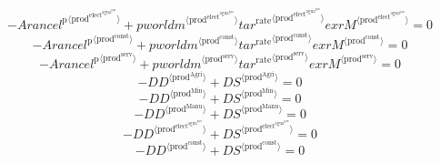 \begin{equation}
-{{A\!r\!a\!n\!c\!e\!l}^{\mathrm{p}}}^{\langle \mathrm{prod}^{\mathrm{elect}^{\mathrm{agua}^{\mathrm{gas}}}}\rangle} + {{{p\!w\!o\!r\!l\!d\!m}}^{\langle \mathrm{\mathrm{prod}^{\mathrm{elect}^{\mathrm{agua}^{\mathrm{gas}}}}}\rangle}} {{{t\!a\!r}^{\mathrm{rate}}}^{\langle \mathrm{\mathrm{prod}^{\mathrm{elect}^{\mathrm{agua}^{\mathrm{gas}}}}}\rangle}} {{e\!x\!r}} {{M}^{\langle \mathrm{prod}^{\mathrm{elect}^{\mathrm{agua}^{\mathrm{gas}}}}\rangle}} = 0
\end{equation}
\begin{equation}
-{{A\!r\!a\!n\!c\!e\!l}^{\mathrm{p}}}^{\langle \mathrm{prod}^{\mathrm{const}}\rangle} + {{{p\!w\!o\!r\!l\!d\!m}}^{\langle \mathrm{\mathrm{prod}^{\mathrm{const}}}\rangle}} {{{t\!a\!r}^{\mathrm{rate}}}^{\langle \mathrm{\mathrm{prod}^{\mathrm{const}}}\rangle}} {{e\!x\!r}} {{M}^{\langle \mathrm{prod}^{\mathrm{const}}\rangle}} = 0
\end{equation}
\begin{equation}
-{{A\!r\!a\!n\!c\!e\!l}^{\mathrm{p}}}^{\langle \mathrm{prod}^{\mathrm{serv}}\rangle} + {{{p\!w\!o\!r\!l\!d\!m}}^{\langle \mathrm{\mathrm{prod}^{\mathrm{serv}}}\rangle}} {{{t\!a\!r}^{\mathrm{rate}}}^{\langle \mathrm{\mathrm{prod}^{\mathrm{serv}}}\rangle}} {{e\!x\!r}} {{M}^{\langle \mathrm{prod}^{\mathrm{serv}}\rangle}} = 0
\end{equation}
\begin{equation}
-{{D\!D}}^{\langle \mathrm{prod}^{\mathrm{Agri}}\rangle} + {{D\!S}}^{\langle \mathrm{prod}^{\mathrm{Agri}}\rangle} = 0
\end{equation}
\begin{equation}
-{{D\!D}}^{\langle \mathrm{prod}^{\mathrm{Min}}\rangle} + {{D\!S}}^{\langle \mathrm{prod}^{\mathrm{Min}}\rangle} = 0
\end{equation}
\begin{equation}
-{{D\!D}}^{\langle \mathrm{prod}^{\mathrm{Manu}}\rangle} + {{D\!S}}^{\langle \mathrm{prod}^{\mathrm{Manu}}\rangle} = 0
\end{equation}
\begin{equation}
-{{D\!D}}^{\langle \mathrm{prod}^{\mathrm{elect}^{\mathrm{agua}^{\mathrm{gas}}}}\rangle} + {{D\!S}}^{\langle \mathrm{prod}^{\mathrm{elect}^{\mathrm{agua}^{\mathrm{gas}}}}\rangle} = 0
\end{equation}
\begin{equation}
-{{D\!D}}^{\langle \mathrm{prod}^{\mathrm{const}}\rangle} + {{D\!S}}^{\langle \mathrm{prod}^{\mathrm{const}}\rangle} = 0
\end{equation}
